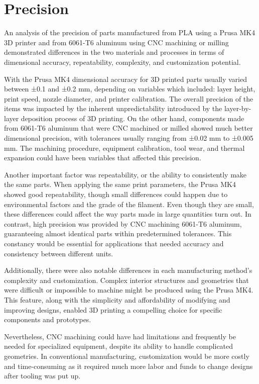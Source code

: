 \section{Precision}

    An analysis of the precision of parts manufactured from PLA using a Prusa MK4 3D printer and from
    6061-T6 aluminum using CNC machining or milling demonstrated differences in the two materials and
    processes in terms of dimensional accuracy, repeatability, complexity, and customization potential.

    With the Prusa MK4 dimensional accuracy for 3D printed parts usually varied between ±0.1 and ±0.2 mm,
    depending on variables which included: layer height, print speed, nozzle diameter, and printer calibration.
    The overall precision of the items was impacted by the inherent unpredictability introduced by the layer-by-layer deposition process of 3D printing. On the other hand, components made from 6061-T6 aluminum
    that were CNC machined or milled showed much better dimensional precision, with tolerances usually
    ranging from ±0.02 mm to ±0.005 mm. The machining procedure, equipment calibration, tool wear, and
    thermal expansion could have been variables that affected this precision.

    Another important factor was repeatability, or the ability to consistently make the same parts. When
    applying the same print parameters, the Prusa MK4 showed good repeatability, though small differences
    could happen due to environmental factors and the grade of the filament. Even though they are small,
    these differences could affect the way parts made in large quantities turn out. In contrast, high precision
    was provided by CNC machining 6061-T6 aluminum, guaranteeing almost identical parts within
    predetermined tolerances. This constancy would be essential for applications that needed accuracy and
    consistency between different units.

    Additionally, there were also notable differences in each manufacturing method's complexity and
    customization. Complex interior structures and geometries that were difficult or impossible to machine
    might be produced using the Prusa MK4. This feature, along with the simplicity and affordability of modifying
    and improving designs, enabled 3D printing a compelling choice for specific components and prototypes.

    Nevertheless, CNC machining could have had limitations and frequently be needed for specialized
    equipment, despite its ability to handle complicated geometries. In conventional manufacturing,
    customization would be more costly and time-consuming as it required much more labor and funds to
    change designs after tooling was put up.

